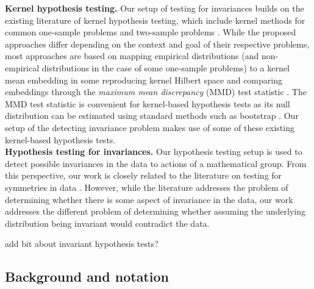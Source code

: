 \textbf{Kernel hypothesis testing.} Our setup of testing for invariances builds on the existing literature of kernel hypothesis testing, which include kernel methods for common one-sample problems \parencite{Zhang:2011,Doran:2014,Kellner:2015,Chwialkowski:2016,Jitkrittum:2020} and two-sample problems \parencite{Gretton:2007,Gretton:2012}. While the proposed approaches differ depending on the context and goal of their respective problems, most approaches are based on mapping empirical  distributions (and non-empirical distributions in the case of some one-sample problems) to a kernel mean embedding in some reproducing kernel Hilbert space and comparing embeddings through the \textit{maximum mean discrepancy} (MMD) test statistic \parencite{Harchaoui:2013}. The MMD test statistic is convenient for kernel-based hypothesis tests as its null distribution can be estimated using standard methods such as bootstrap \parencite{Gretton:2012}. Our setup of the detecting invariance problem makes use of some of these existing kernel-based hypothesis tests.
\\

\textbf{Hypothesis testing for invariances.}
Our hypothesis testing setup is used to detect possible invariances in the data to actions of a mathematical group. From this perspective, our work is closely related to the literature on testing for symmetries in data \parencite{Henze:2003,NgatchouWandji:2009,Partlett:2015}. However, while the literature addresses the problem of determining whether there is some aspect of invariance in the data, our work addresses the different problem of determining whether assuming the underlying distribution being invariant would contradict the data.

\todo add bit about invariant hypothesis tests?

\subsection{Background and notation} \label{sec:background}

